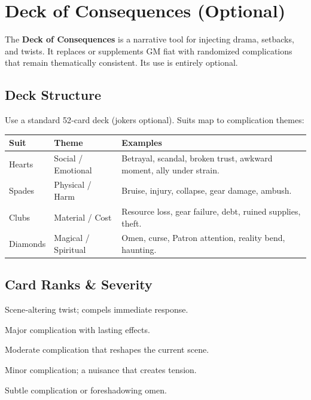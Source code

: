\section{Deck of Consequences (Optional)}
\label{sec:deck-consequences}

The \textbf{Deck of Consequences} is a narrative tool for injecting drama, setbacks, and twists. It replaces or supplements GM fiat with randomized complications that remain thematically consistent. Its use is entirely optional.

\subsection{Deck Structure}
Use a standard 52‑card deck (jokers optional). Suits map to complication themes:

\begin{center}
\begin{longtable}{@{}llp{8cm}@{}}
\toprule
\textbf{Suit} & \textbf{Theme} & \textbf{Examples} \\
\midrule
Hearts   & Social / Emotional & Betrayal, scandal, broken trust, awkward moment, ally under strain. \\
Spades   & Physical / Harm    & Bruise, injury, collapse, gear damage, ambush. \\
Clubs    & Material / Cost    & Resource loss, gear failure, debt, ruined supplies, theft. \\
Diamonds & Magical / Spiritual & Omen, curse, Patron attention, reality bend, haunting. \\
\bottomrule
\end{longtable}
\end{center}

\subsection{Card Ranks \& Severity}
\begin{description}[leftmargin=1.5em, style=nextline]
  \item[Ace:] Scene‑altering twist; compels immediate response.
  \item[King/Queen/Jack:] Major complication with lasting effects.
  \item[10--8:] Moderate complication that reshapes the current scene.
  \item[7--5:] Minor complication; a nuisance that creates tension.
  \item[4--2:] Subtle complication or foreshadowing omen.
\end{description}

